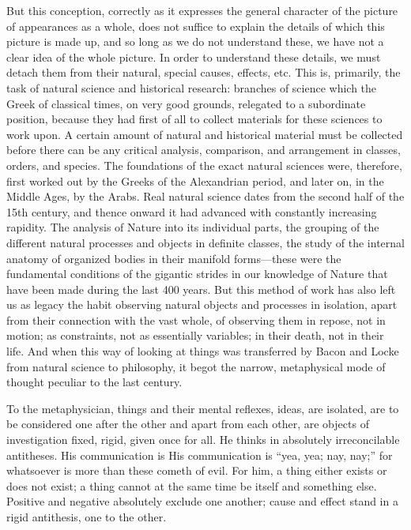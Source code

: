 But this conception, correctly as it expresses the general character of the
picture of appearances as a whole, does not suffice to explain the details of
which this picture is made up, and so long as we do not understand these, we
have not a clear idea of the whole picture. In order to understand these
details, we must detach them from their natural, special causes, effects, etc.
This is, primarily, the task of natural science and historical research:
branches of science which the Greek of classical times, on very good grounds,
relegated to a subordinate position, because they had first of all to collect
materials for these sciences to work upon. A certain amount of natural and
historical material must be collected before there can be any critical
analysis, comparison, and arrangement in classes, orders, and species. The
foundations of the exact natural sciences were, therefore, first worked out by
the Greeks of the Alexandrian period, and later on, in the Middle Ages, by the Arabs. Real natural science dates
from the second half of the 15th century, and thence onward it had advanced
with constantly increasing rapidity. The analysis of Nature into its individual
parts, the grouping of the different natural processes and objects in definite
classes, the study of the internal anatomy of organized bodies in their
manifold forms---these were the fundamental conditions of the gigantic strides
in our knowledge of Nature that have been made during the last 400 years. But
this method of work has also left us as legacy the habit observing natural
objects and processes in isolation, apart from their connection with the vast
whole, of observing them in repose, not in motion; as constraints, not as
essentially variables; in their death, not in their life. And when this way of
looking at things was transferred by Bacon and Locke from natural science to
philosophy, it begot the narrow, metaphysical mode of thought peculiar to the
last century.

To the metaphysician, things and their mental reflexes, ideas, are isolated, are
to be considered one after the other and apart from each other, are objects of
investigation fixed, rigid, given once for all. He thinks in absolutely
irreconcilable antitheses. His communication is His communication is ``yea, yea;
nay, nay;'' for whatsoever is more than these cometh of evil. For him, a thing
either exists or does not exist; a thing cannot at the same time be itself and
something else. Positive and negative absolutely exclude one another; cause and
effect stand in a rigid antithesis, one to the other.

